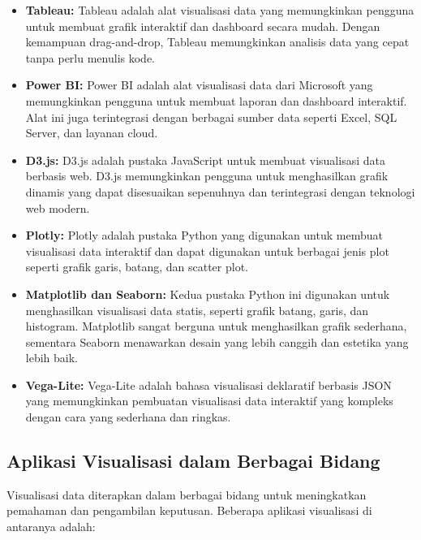\begin{itemize}
    \item \textbf{Tableau:} Tableau adalah alat visualisasi data yang memungkinkan pengguna untuk membuat grafik interaktif dan dashboard secara mudah. Dengan kemampuan drag-and-drop, Tableau memungkinkan analisis data yang cepat tanpa perlu menulis kode.
    \item \textbf{Power BI:} Power BI adalah alat visualisasi data dari Microsoft yang memungkinkan pengguna untuk membuat laporan dan dashboard interaktif. Alat ini juga terintegrasi dengan berbagai sumber data seperti Excel, SQL Server, dan layanan cloud.
    \item \textbf{D3.js:} D3.js adalah pustaka JavaScript untuk membuat visualisasi data berbasis web. D3.js memungkinkan pengguna untuk menghasilkan grafik dinamis yang dapat disesuaikan sepenuhnya dan terintegrasi dengan teknologi web modern.
    \item \textbf{Plotly:} Plotly adalah pustaka Python yang digunakan untuk membuat visualisasi data interaktif dan dapat digunakan untuk berbagai jenis plot seperti grafik garis, batang, dan scatter plot.
    \item \textbf{Matplotlib dan Seaborn:} Kedua pustaka Python ini digunakan untuk menghasilkan visualisasi data statis, seperti grafik batang, garis, dan histogram. Matplotlib sangat berguna untuk menghasilkan grafik sederhana, sementara Seaborn menawarkan desain yang lebih canggih dan estetika yang lebih baik.
    \item \textbf{Vega-Lite:} Vega-Lite adalah bahasa visualisasi deklaratif berbasis JSON yang memungkinkan pembuatan visualisasi data interaktif yang kompleks dengan cara yang sederhana dan ringkas.
\end{itemize}

\subsection{Aplikasi Visualisasi dalam Berbagai Bidang}
\label{subsec:aplikasi_visualisasi}

Visualisasi data diterapkan dalam berbagai bidang untuk meningkatkan pemahaman dan pengambilan keputusan. Beberapa aplikasi visualisasi di antaranya adalah:

